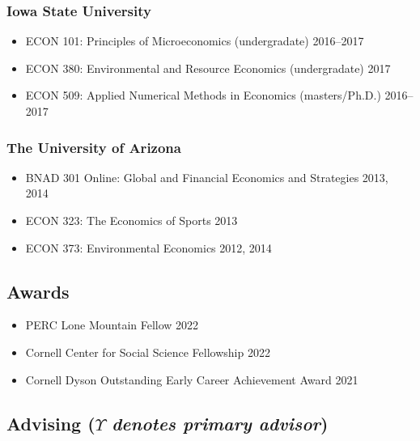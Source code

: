 \documentclass[12pt]{res} %
\begin{document}
\begin{resume}
\subsubsection{Iowa State University}
\begin{itemize} \itemsep -1pt
	\item[] ECON 101: Principles of Microeconomics (undergradate) \hfill 2016--2017
	\item[] ECON 380: Environmental and Resource Economics (undergradate) \hfill 2017
	\item[] ECON 509: Applied Numerical Methods in Economics (masters/Ph.D.) \hfill 2016--2017
\end{itemize}\vspace{-.3in}
\subsubsection{The University of Arizona}
\begin{itemize} \itemsep -1pt %
	\item[] BNAD 301 Online: Global and Financial Economics and Strategies \hfill 2013, 2014
	\item[] ECON 323: The Economics of Sports \hfill 2013
	\item[] ECON 373: Environmental Economics \hfill 2012, 2014
\end{itemize}

\vspace{-.2in}

\subsection{Awards}
\begin{itemize} \itemsep -1pt
	\item[] PERC Lone Mountain Fellow \hfill 2022
	\item[] Cornell Center for Social Science Fellowship \hfill 2022
	\item[] Cornell Dyson Outstanding Early Career Achievement Award \hfill 2021
\end{itemize}

\vspace{-.2in}

\subsection{Advising ($\Upsilon$ \textit{denotes primary advisor})  }
\vspace{-.2in}
 

\end{resume}
\end{document}
